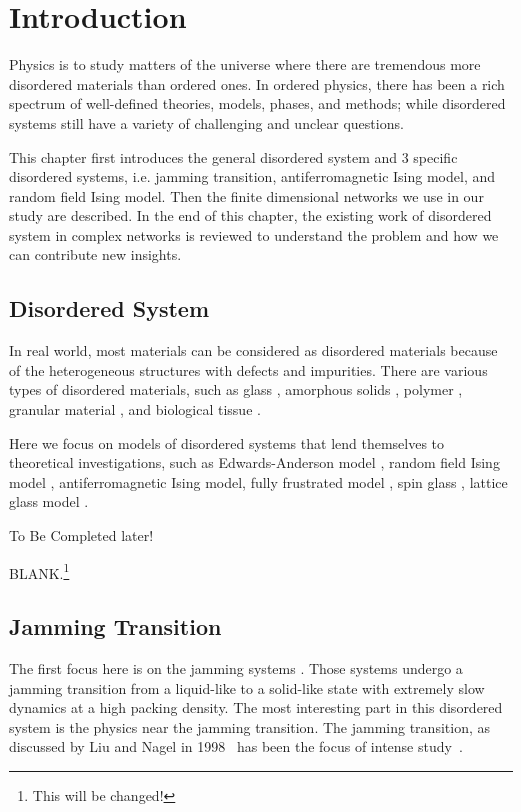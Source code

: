 \chapter{Introduction}
\label{chap-intro}

Physics is to study matters of the universe where 
there are tremendous more disordered materials than ordered ones.
In ordered physics, there has been a rich spectrum of 
well-defined theories, models, phases, and methods; while disordered 
systems still have a variety of challenging and unclear questions. 

This chapter first introduces the general disordered system and 3 specific disordered systems, i.e. jamming transition, antiferromagnetic Ising model, and random field Ising model. Then the finite dimensional networks we use in our study are described. In the end of this chapter, the existing work of disordered system in complex networks is reviewed to understand the problem and how we can contribute new insights.

\section{Disordered System}
In real world, most materials can be considered as disordered materials because of the heterogeneous structures with defects and impurities. There are various types of disordered materials, such as glass \cite{Gibbs1958nature}, amorphous solids \cite{berthier2016facets}, polymer \cite{roth2005glass}, granular material \cite{richard2005slow}, and biological tissue \cite{bi2015density}. 

Here we focus on models of disordered systems that lend themselves to theoretical investigations, such as Edwards-Anderson model \cite{edwards1975theory}, random field Ising model \cite{imry1975random}, antiferromagnetic Ising model\cite{wannier1950afm},  fully frustrated model \cite{kosterlitz1973ordering, kosterlitz1974critical}, spin glass \cite{young1997spin}, lattice glass model \cite{Biroli02}. 

To Be Completed later!

BLANK.\footnote{This will be changed!}

\section{Jamming Transition}
\label{sec:jam_intro}
The first focus here is on the jamming systems \cite{Biroli2007}. Those systems undergo 
a jamming transition from a liquid-like to a solid-like state with extremely slow 
dynamics at a high packing density. The most interesting part in this 
disordered system is the physics near the jamming transition. 
The jamming transition, as discussed by Liu and
Nagel in 1998~\cite{Liu1998} has been the focus of
intense study~\cite{Biroli2007,Liu2010,Berthier2011}. 

